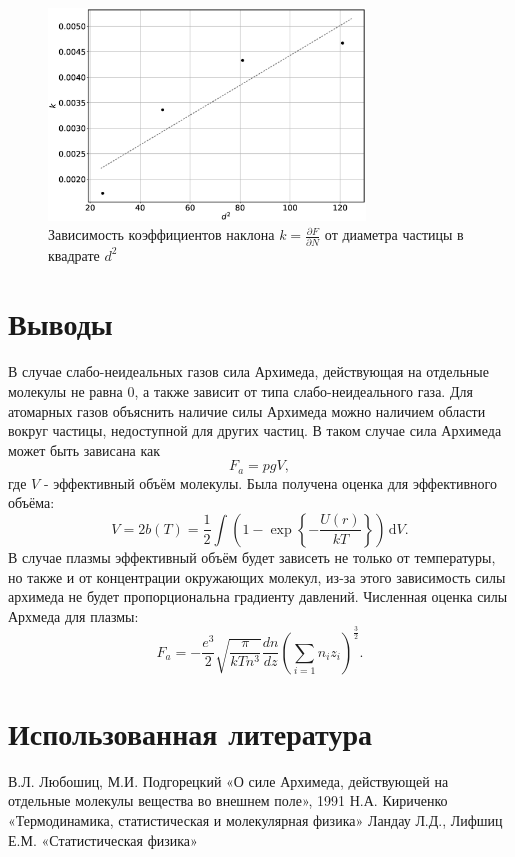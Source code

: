 \documentclass[12pt]{article}
\begin{document}
\begin{figure}[H]
    \centering
    \includegraphics[width=0.75\textwidth]{kr.eps}
    \caption{Зависимость коэффициентов наклона $k = \frac{\partial F}{\partial N}$ от диаметра частицы в 
    квадрате $d^2$}
    \label{fig:kr}
\end{figure}

\section{Выводы}
В случае слабо-неидеальных газов сила Архимеда, действующая на отдельные молекулы не равна 0, а также 
зависит от типа слабо-неидеального газа. Для атомарных газов объяснить наличие силы Архимеда можно 
наличием области вокруг частицы, недоступной для других частиц. В таком случае сила Архимеда может быть зависана 
как 
\[
    F_a = pgV, 
\]
где $V$ - эффективный объём молекулы. Была получена оценка для эффективного объёма: 
\[
    V = 2b(T) = \frac{1}{2} \int \left( 1 - \exp \left\{ -\frac{U(r)}{kT} \right\}  \right)  \,\mathrm{d}V.
\] 
В случае плазмы эффективный объём будет зависеть не только от температуры, но также и от концентрации 
окружающих молекул, из-за этого зависимость силы архимеда не будет пропорциональна градиенту давлений. 
Численная оценка силы Архмеда для плазмы: 
\[
    F_a = -\frac{e^3}{2} \sqrt{\frac{\pi}{kTn^3}} \frac{dn}{dz} \left( \sum_{i=1} n_i z_i \right)^\frac{3}{2}.
\]

\section{Использованная литература}
\begin{thebibliography}{9}
    В.Л. Любошиц, М.И. Подгорецкий «О силе Архимеда, действующей на отдельные молекулы вещества во внешнем поле», 1991
    Н.А. Кириченко «Термодинамика, статистическая и молекулярная физика»
    Ландау Л.Д., Лифшиц Е.М. «Статистическая физика»
\end{thebibliography}
\end{document}
